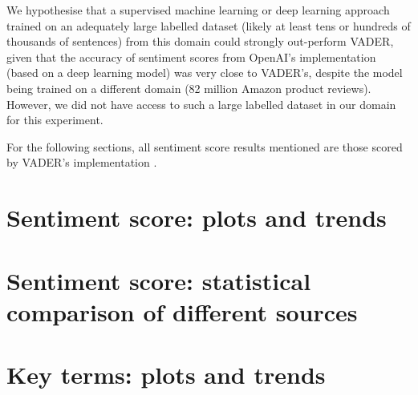 \documentclass{report}
\begin{document}
We hypothesise that a supervised machine learning or deep learning approach trained on an adequately large labelled dataset (likely at least tens or hundreds of thousands of sentences) from this domain could strongly out-perform VADER, given that the accuracy of sentiment scores from OpenAI's implementation (based on a deep learning model) was very close to VADER's, despite the model being trained on a different domain (82 million Amazon product reviews). 
However, we did not have access to such a large labelled dataset in our domain for this experiment.

For the following sections, all sentiment score results mentioned are those scored by VADER's implementation \cite{VADER}.

\section{Sentiment score: plots and trends} \label{Sentiment score: plots and trends}

\section{Sentiment score: statistical comparison of different sources} \label{Sentiment score: statistical comparison of different sources}


\section{Key terms: plots and trends} \label{Key terms: plots and trends}


\end{document}
